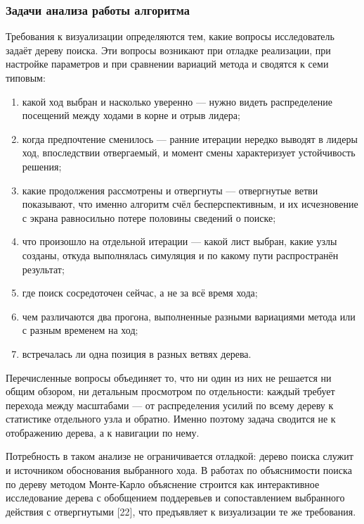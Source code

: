 \subsubsection{Задачи анализа работы алгоритма}

Требования к визуализации определяются тем, какие вопросы исследователь задаёт дереву поиска. Эти вопросы возникают при отладке реализации, при настройке параметров и при сравнении вариаций метода и сводятся к семи типовым:

\begin{enumerate}

  \item какой ход выбран и насколько уверенно — нужно видеть распределение посещений между ходами в корне и отрыв лидера;

  \item когда предпочтение сменилось — ранние итерации нередко выводят в лидеры ход, впоследствии отвергаемый, и момент смены характеризует устойчивость решения;

  \item какие продолжения рассмотрены и отвергнуты — отвергнутые ветви показывают, что именно алгоритм счёл бесперспективным, и их исчезновение с экрана равносильно потере половины сведений о поиске;

  \item что произошло на отдельной итерации — какой лист выбран, какие узлы созданы, откуда выполнялась симуляция и по какому пути распространён результат;

  \item где поиск сосредоточен сейчас, а не за всё время хода;

  \item чем различаются два прогона, выполненные разными вариациями метода или с разным временем на ход;

  \item встречалась ли одна позиция в разных ветвях дерева.

\end{enumerate}

Перечисленные вопросы объединяет то, что ни один из них не решается ни общим обзором, ни детальным просмотром по отдельности: каждый требует перехода между масштабами — от распределения усилий по всему дереву к статистике отдельного узла и обратно. Именно поэтому задача сводится не к отображению дерева, а к навигации по нему.

Потребность в таком анализе не ограничивается отладкой: дерево поиска служит и источником обоснования выбранного хода. В работах по объяснимости поиска по дереву методом Монте-Карло объяснение строится как интерактивное исследование дерева с обобщением поддеревьев и сопоставлением выбранного действия с отвергнутыми [22], что предъявляет к визуализации те же требования.

